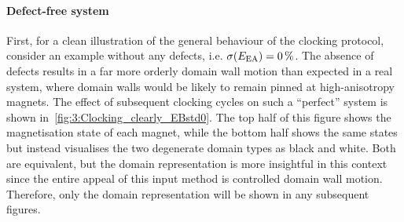 \paragraph{Defect-free system}
First, for a clean illustration of the general behaviour of the clocking protocol, consider an example without any defects, i.e. $\sigma(E_\mathrm{EA}) = \SI{0}{\percent}$.
The absence of defects results in a far more orderly domain wall motion than expected in a real system, where domain walls would be likely to remain pinned at high-anisotropy magnets.
The effect of subsequent clocking cycles on such a ``perfect'' system is shown in~\cref{fig:3:Clocking_clearly_EBstd0}.
The top half of this figure shows the magnetisation state of each magnet, while the bottom half shows the same states but instead visualises the two degenerate domain types as black and white.
Both are equivalent, but the domain representation is more insightful in this context since the entire appeal of this input method is controlled domain wall motion.
Therefore, only the domain representation will be shown in any subsequent figures.


